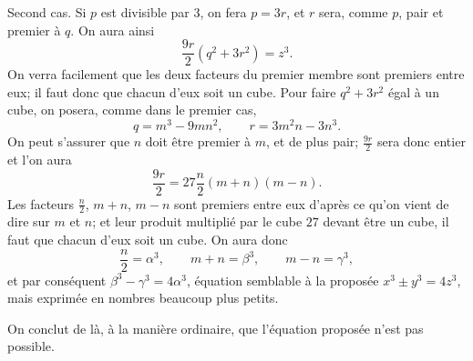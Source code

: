 \documentclass[11pt]{article}
\begin{document}
Second cas. Si $p$ est divisible par $3$, on fera $p=3r$, et $r$ sera, comme $p$, pair et premier à $q$. On aura ainsi
\[
 \frac{9r}{2}(q^2+3r^2)=z^3.
\]
On verra facilement que les deux facteurs du premier membre sont premiers entre eux; il faut donc que chacun d'eux soit un cube. Pour faire $q^2+3r^2$ égal à un cube, on posera, comme dans le premier cas,
\[
 q=m^3-9mn^2,\qquad r=3m^2n-3n^3.
\]
On peut s'assurer que $n$ doit être premier à $m$, et de plus pair; $\frac{9r}{2}$ sera donc entier et l'on aura
\[
 \frac{9r}{2}=27\frac n2(m+n)(m-n).
\]
Les facteurs $\frac n2$, $m+n$, $m-n$ sont premiers entre eux d'après ce qu'on vient de dire sur $m$ et $n$; et leur produit multiplié par le cube $27$ devant être un cube, il faut que chacun d'eux soit un cube. On aura donc
\[
 \frac n2=\alpha^3,\qquad m+n=\beta^3,\qquad m-n=\gamma^3,
\]
et par conséquent $\beta^3-\gamma^3=4\alpha^3$, équation semblable à la proposée $x^3\pm y^3=4z^3$, mais exprimée en nombres beaucoup plus petits.

On conclut de là, à la manière ordinaire, que l'équation proposée n'est pas possible.
\end{document}
